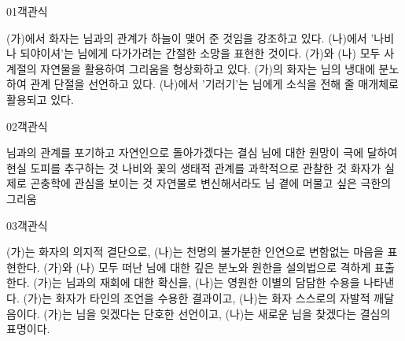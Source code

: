 \documentclass[fs85,seriesWit]{korfarm-base}
\begin{document}
\kfBeginMC
\begin{kfQBlock}{01}{객관식}
\begin{kfChoices}
\kfChoice (가)에서 화자는 님과의 관계가 하늘이 맺어 준 것임을 강조하고 있다.
\kfChoice (나)에서 '나비나 되야이셔'는 님에게 다가가려는 간절한 소망을 표현한 것이다.
\kfChoice (가)와 (나) 모두 사계절의 자연물을 활용하여 그리움을 형상화하고 있다.
\kfChoice (가)의 화자는 님의 냉대에 분노하여 관계 단절을 선언하고 있다.
\kfChoice (나)에서 '기러기'는 님에게 소식을 전해 줄 매개체로 활용되고 있다.
\end{kfChoices}
\end{kfQBlock}

\begin{kfQBlock}{02}{객관식}
\begin{kfChoices}
\kfChoice 님과의 관계를 포기하고 자연인으로 돌아가겠다는 결심
\kfChoice 님에 대한 원망이 극에 달하여 현실 도피를 추구하는 것
\kfChoice 나비와 꽃의 생태적 관계를 과학적으로 관찰한 것
\kfChoice 화자가 실제로 곤충학에 관심을 보이는 것
\kfChoice 자연물로 변신해서라도 님 곁에 머물고 싶은 극한의 그리움
\end{kfChoices}
\end{kfQBlock}

\begin{kfQBlock}{03}{객관식}
\begin{kfChoices}
\kfChoice (가)는 화자의 의지적 결단으로, (나)는 천명의 불가분한 인연으로 변함없는 마음을 표현한다.
\kfChoice (가)와 (나) 모두 떠난 님에 대한 깊은 분노와 원한을 설의법으로 격하게 표출한다.
\kfChoice (가)는 님과의 재회에 대한 확신을, (나)는 영원한 이별의 담담한 수용을 나타낸다.
\kfChoice (가)는 화자가 타인의 조언을 수용한 결과이고, (나)는 화자 스스로의 자발적 깨달음이다.
\kfChoice (가)는 님을 잊겠다는 단호한 선언이고, (나)는 새로운 님을 찾겠다는 결심의 표명이다.
\end{kfChoices}
\end{kfQBlock}
\end{document}
